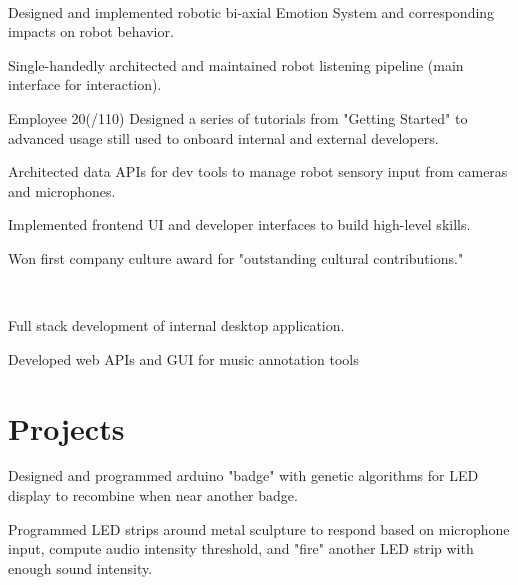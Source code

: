 \documentclass[]{csaund_resume-openfont}
\begin{document}
\begin{minipage}[t]{0.66\textwidth}
 \\
\begin{tightemize}
\item Designed and implemented robotic bi-axial Emotion System and corresponding impacts on robot behavior.
\item Single-handedly architected and maintained robot listening pipeline (main interface for interaction).
\end{tightemize}
\begin{tightemize}
\item Employee 20(/110) Designed a series of tutorials from "Getting Started" to advanced usage still used to onboard internal and external developers.
\item Architected data APIs for dev tools to manage robot sensory input from cameras and microphones.
\item Implemented frontend UI and developer interfaces to build high-level skills.
\item Won first company culture award for "outstanding cultural contributions."
\end{tightemize}
\sectionsep

 \\
\begin{tightemize}
\item Full stack development of internal desktop application.
\item Developed web APIs and GUI for music annotation tools
\end{tightemize}
\sectionsep



\section{Projects}
\begin{tightemize}
\item Designed and programmed arduino "badge" with  genetic algorithms for LED display to recombine when near another badge.
\end{tightemize}
\sectionsep
{}
\begin{tightemize}
\item Programmed LED strips around metal sculpture to respond based on microphone input, compute audio intensity threshold, and "fire" another LED strip with enough sound intensity.
\end{tightemize}
\sectionsep

\end{minipage}
\end{document}
